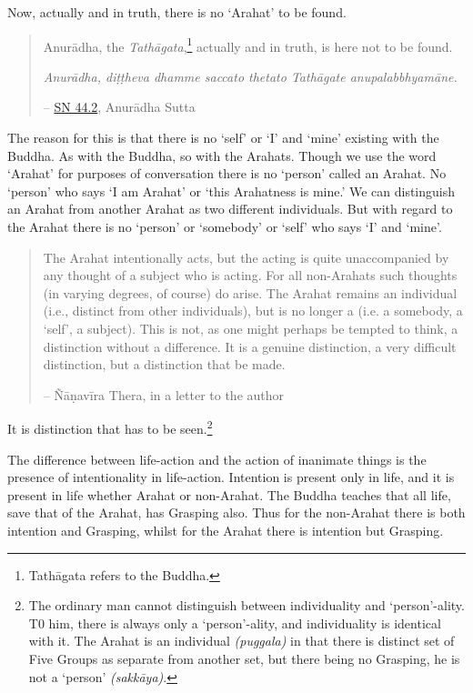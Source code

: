 Now, actually and in truth, there is no `Arahat' to be found.

\begin{quote}
Anurādha, the \emph{Tathāgata},\footnote{Tathāgata refers to the Buddha.} actually and in truth, is here not to be found.

\emph{Anurādha, diṭṭheva dhamme saccato thetato Tathāgate anupalabbhyamāne.}

 -- \href{https://suttacentral.net/sn44.2/en/sujato}{SN 44.2}, Anurādha Sutta
\end{quote}

The reason for this is that there is no `self' or `I' and `mine' existing with the Buddha. As with the Buddha, so with the Arahats. Though we use the word `Arahat' for purposes of conversation there is no `person' called an Arahat. No `person' who says `I am Arahat' or `this Arahatness is mine.' We can distinguish an Arahat from another Arahat as two different individuals. But with regard to the Arahat there is no `person' or `somebody' or `self' who says `I' and `mine'.

\begin{quote}
The Arahat intentionally acts, but the acting is quite unaccompanied by any thought of a subject who is acting. For all non-Arahats such thoughts (in varying degrees, of course) do arise. The Arahat remains an individual (i.e., distinct from other individuals), but is no longer a  (i.e. a somebody, a `self', a subject). This is not, as one might perhaps be tempted to think, a distinction without a difference. It is a genuine distinction, a very difficult distinction, but a distinction that  be made.

 -- Ñāṇavīra Thera, in a letter to the author
\end{quote}

It is  distinction that has to be seen.\footnote{The ordinary man cannot distinguish between individuality and `person'-ality. T0 him, there is always only a `person'-ality, and individuality is identical with it. The Arahat is an individual \emph{(puggala)} in that there is distinct set of Five Groups as separate from another set, but there being no Grasping, he is not a `person' \emph{(sakkāya)}.}

The difference between life-action and the action of inanimate things is the presence of intentionality in life-action. Intention is present only in life, and it is present in  life whether Arahat or non-Arahat. The Buddha teaches that all life, save that of the Arahat, has Grasping also. Thus for the non-Arahat there is both intention and Grasping, whilst for the Arahat there is intention but  Grasping.


